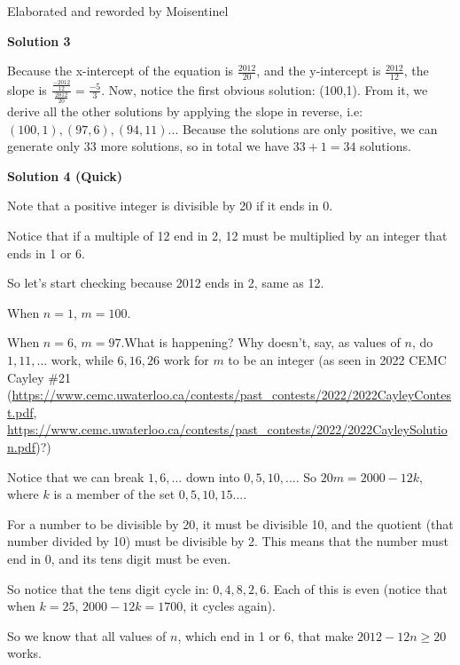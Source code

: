 \begin{enumerate}
 Elaborated and reworded by Moisentinel

 



\textbf{Solution 3}

Because the x-intercept of the equation is $\frac{2012}{20}$, and the y-intercept is $\frac{2012}{12}$, the slope is $\frac{\frac{-2012}{12}}{\frac{2012}{20}} = \frac{-5}{3}$. Now, notice the first obvious solution: (100,1). From it, we derive all the other solutions by applying the slope in reverse, i.e: $(100,1), (97,6), (94,11)...$ Because the solutions are only positive, we can generate only 33 more solutions, so in total we have $33+1=\boxed{34}$ solutions.

 



\textbf{Solution 4 (Quick)}

Note that a positive integer is divisible by 20 if it ends in 0.

 Notice that if a multiple of 12 end in 2, 12 must be multiplied by an integer that ends in 1 or 6.

 So let's start checking because 2012 ends in 2, same as 12. 

 When $n=1$, $m=100$.

 When $n=6$, $m=97$.What is happening? Why doesn't, say, as values of $n$, do $1, 11, ...$ work, while $6, 16, 26$ work for $m$ to be an integer (as seen in 2022 CEMC Cayley \#21 (\href{https://www.cemc.uwaterloo.ca/contests/past\_contests/2022/2022CayleyContest.pdf}{https://www.cemc.uwaterloo.ca/contests/past\_contests/2022/2022CayleyContest.pdf}, \href{https://www.cemc.uwaterloo.ca/contests/past\_contests/2022/2022CayleySolution.pdf}{https://www.cemc.uwaterloo.ca/contests/past\_contests/2022/2022CayleySolution.pdf})?)

 Notice that we can break $1, 6, ...$ down into $0, 5, 10, ...$. So $20m=2000-12k$, where $k$ is a member of the set ${0, 5, 10, 15...}$.

 For a number to be divisible by 20, it must be divisible 10, and the quotient (that number divided by 10) must be divisible by 2. This means that the number must end in 0, and its tens digit must be even.

 So notice that the tens digit cycle in: $0, 4, 8, 2, 6$. Each of this is even (notice that when $k=25$, $2000-12k=1700$, it cycles again).

 So we know that all values of $n$, which end in 1 or 6, that make $2012-12n\geq20$ works.


\end{enumerate}
